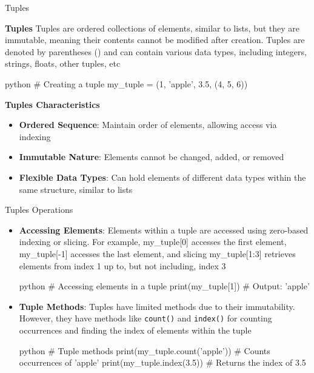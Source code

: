 \documentclass[
	11pt, 
]{beamer}
\begin{document}
\begin{frame}[fragile]{Tuples}
\scriptsize
    
\begin{block}{\textbf{Tuples}}
 Tuples are ordered collections of elements, similar to lists, but they are immutable, meaning their contents cannot be modified after creation. Tuples are denoted by parentheses () and can contain various data types, including integers, strings, floats, other tuples, etc
\end{block}
\begin{mintedbox}{python}
# Creating a tuple
my_tuple = (1, 'apple', 3.5, (4, 5, 6))
\end{mintedbox}

\begin{exampleblock}{\textbf{Tuples Characteristics}}
    \begin{itemize}
        \item \textbf{Ordered Sequence}: Maintain order of elements, allowing access via indexing
        \item \textbf{Immutable Nature}: Elements cannot be changed, added, or removed
        \item \textbf{Flexible Data Types}: Can hold elements of different data types within the same structure, similar to lists
    \end{itemize}    
\end{exampleblock}

\end{frame}


\begin{frame}[fragile]{Tuples Operations}
\scriptsize
\begin{itemize}
    \item \textbf{Accessing Elements}: Elements within a tuple are accessed using zero-based indexing or slicing. For example, my\_tuple[0] accesses the first element, my\_tuple[-1] accesses the last element, and slicing my\_tuple[1:3] retrieves elements from index 1 up to, but not including, index 3

    \vspace{.5cm}

    \begin{mintedbox}{python}
# Accessing elements in a tuple
print(my_tuple[1])  # Output: 'apple'
    \end{mintedbox}

    \item \textbf{Tuple Methods}: Tuples have limited methods due to their immutability. However, they have methods like \texttt{count()} and \texttt{index()} for counting occurrences and finding the index of elements within the tuple

    \begin{mintedbox}{python}
# Tuple methods
print(my_tuple.count('apple'))  # Counts occurrences of 'apple' 
print(my_tuple.index(3.5))  # Returns the index of 3.5 
    \end{mintedbox}
    
\end{itemize}
\end{frame}
\end{document}
